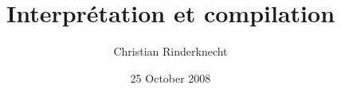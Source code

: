 
%
\usepackage[latin1]{inputenc}
\usepackage[T1]{fontenc}
\usepackage[francais]{babel}

%
\usepackage{graphicx}

%
\usepackage{amssymb,amsmath,stmaryrd}

%
\usepackage{pst-node,pst-tree}

%
\usepackage{mathpartir}

%
\usepackage{url,xspace}

%
\newtheorem{Prop}{Proposition}

%






%
\title{Interpr\'etation et compilation}
\author{Christian Rinderknecht}
\date{25 October 2008}



\frame{\maketitle}



